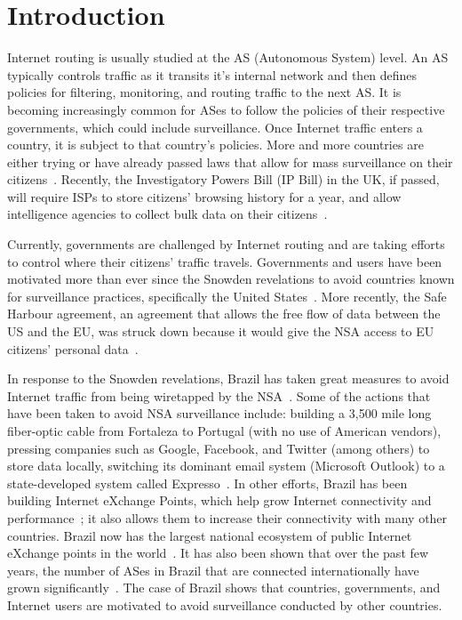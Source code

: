 \section{Introduction}
\label{intro}

Internet routing is usually studied at the AS (Autonomous System) level.  An AS typically controls traffic as it transits it's internal network and then defines policies for filtering, monitoring, and routing traffic to the next AS.  It is becoming increasingly common for ASes to follow the policies of their respective governments, which could include surveillance.  Once Internet traffic enters a country, it is subject to that country's policies.  More and more countries are either trying or have already passed laws that allow for mass surveillance on their citizens~\cite{france_surveillance, netherlands_surveillance, kazak_surveillance}.  Recently, the Investigatory Powers Bill (IP Bill) in the UK, if passed, will require ISPs to store citizens' browsing history for a year, and allow intelligence agencies to collect bulk data on their citizens~\cite{uk_bill}.

Currently, governments are challenged by Internet routing and are taking efforts to control where their citizens' traffic travels.  Governments and users have been motivated more than ever since the Snowden revelations to avoid countries known for surveillance practices, specifically the United States~\cite{russia_secure_internet, routing_errors, dte}.  More recently, the Safe Harbour agreement, an agreement that allows the free flow of data between the US and the EU, was struck down because it would give the NSA access to EU citizens' personal data~\cite{safe_harbour_illegal, safe_harbour_undecided}.

In response to the Snowden revelations, Brazil has taken great measures to avoid Internet traffic from being wiretapped by the NSA~\cite{brazil_history, brazil_break_from_US, brazil_conference, brazil_conference2, brazil_human_rights}.  Some of the actions that have been taken to avoid NSA surveillance include: building a 3,500 mile long fiber-optic cable from Fortaleza to Portugal (with no use of American vendors), pressing companies such as Google, Facebook, and Twitter (among others) to store data locally, switching its dominant email system (Microsoft Outlook) to a state-developed system called Expresso~\cite{brazil_cable, brazil_us_companies}.  In other efforts, Brazil has been building Internet eXchange Points, which help grow Internet connectivity and performance~\cite{brazil_IXP1, brazil_IXP2}; it also allows them to increase their connectivity with many other countries.  Brazil now has the largest national ecosystem of public Internet eXchange points in the world~\cite{brazil_ixp_ecosystem}.  It has also been shown that over the past few years, the number of ASes in Brazil that are connected internationally have grown significantly~\cite{brazil_international_ases}.  The case of Brazil shows that countries, governments, and Internet users are motivated to avoid surveillance conducted by other countries.

